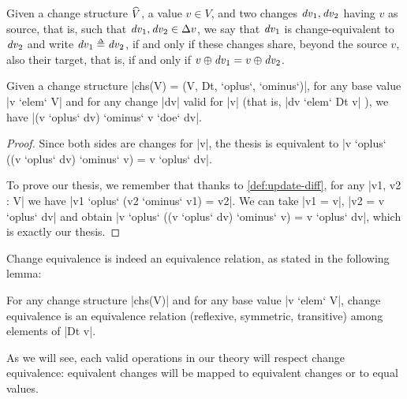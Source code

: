 \begin{definition}
  Given a change structure $\widehat{V}$, a value $v \in V$,
  and two changes $\mathit{dv}_1, \mathit{dv}_2$ having $v$ as source, that is,
  such that $\D v_1, \D v_2\in \Change{v}$, we say that $\mathit{dv}_1$
  is change-equivalent to $\mathit{dv}_2$ and write
  $\D v_1 \Doe \D v_2$, if and only if these changes share,
  beyond the source $v$, also their target, that is, if and only
  if $\Update{v}{\D v_1} = \Update{v}{\D v_2}$.
\end{definition}

\begin{lemma}
  \label{def:diff-update-lemma}
  Given a change structure |chs(V) = (V, Dt, `oplus`, `ominus`)|,
  for any base value |v `elem` V| and for any change |dv| valid
  for |v| (that is, |dv `elem` Dt v| ), we have |(v `oplus` dv)
  `ominus` v `doe` dv|.
\end{lemma}
\begin{proof}
Since both sides are changes for |v|, the thesis is equivalent to |v `oplus` ((v
`oplus` dv) `ominus` v) = v `oplus` dv|.

To prove our thesis, we remember that thanks to \cref{def:update-diff},
for any |v1, v2 : V| we have |v1 `oplus` (v2 `ominus` v1) = v2|. We can take |v1
= v|, |v2 = v `oplus` dv| and obtain |v `oplus` ((v `oplus` dv) `ominus` v) = v
`oplus` dv|, which is exactly our thesis.
\end{proof}

Change equivalence is indeed an equivalence relation, as stated
in the following lemma:
\begin{lemma}
  For any change structure |chs(V)| and for any base value |v
  `elem` V|, change equivalence is an equivalence relation
  (reflexive, symmetric, transitive) among elements of |Dt v|.
\end{lemma}

As we will see, each valid operations in our theory will respect
change equivalence: equivalent changes will be mapped to
equivalent changes or to equal values.

